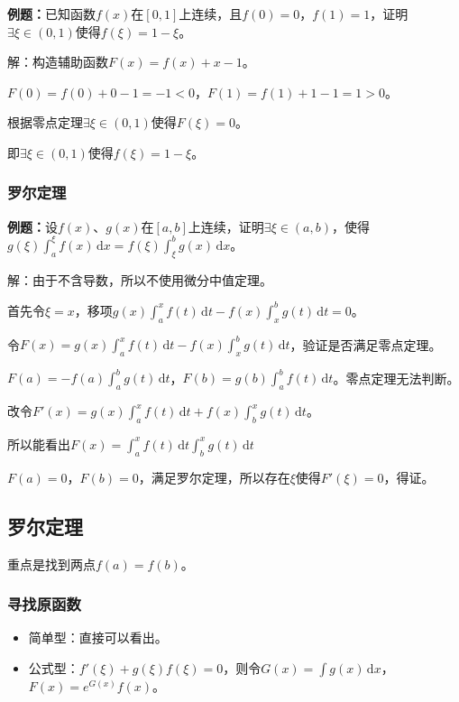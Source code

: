 \textbf{例题：}已知函数$f(x)$在$[0,1]$上连续，且$f(0)=0$，$f(1)=1$，证明$\exists\xi\in(0,1)$使得$f(\xi)=1-\xi$。

解：构造辅助函数$F(x)=f(x)+x-1$。

$F(0)=f(0)+0-1=-1<0$，$F(1)=f(1)+1-1=1>0$。

根据零点定理$\exists\xi\in(0,1)$使得$F(\xi)=0$。

即$\exists\xi\in(0,1)$使得$f(\xi)=1-\xi$。

\subsubsection{罗尔定理}

\textbf{例题：}设$f(x)$、$g(x)$在$[a,b]$上连续，证明$\exists\xi\in(a,b)$，使得$g(\xi)\int_a^\xi f(x)\,\textrm{d}x=f(\xi)\int_\xi^bg(x)\,\textrm{d}x$。

解：由于不含导数，所以不使用微分中值定理。

首先令$\xi=x$，移项$g(x)\int_a^xf(t)\,\textrm{d}t-f(x)\int_x^bg(t)\,\textrm{d}t=0$。

令$F(x)=g(x)\int_a^xf(t)\,\textrm{d}t-f(x)\int_x^bg(t)\,\textrm{d}t$，验证是否满足零点定理。

$F(a)=-f(a)\int_a^bg(t)\,\textrm{d}t$，$F(b)=g(b)\int_a^bf(t)\,\textrm{d}t$。零点定理无法判断。

改令$F'(x)=g(x)\int_a^xf(t)\,\textrm{d}t+f(x)\int_b^xg(t)\,\textrm{d}t$。

所以能看出$F(x)=\int_a^xf(t)\,\textrm{d}t\int_b^xg(t)\,\textrm{d}t$

$F(a)=0$，$F(b)=0$，满足罗尔定理，所以存在$\xi$使得$F'(\xi)=0$，得证。

\subsection{罗尔定理}

重点是找到两点$f(a)=f(b)$。

\subsubsection{寻找原函数}


\begin{itemize}
    \item 简单型：直接可以看出。
    \item 公式型：$f'(\xi)+g(\xi)f(\xi)=0$，则令$G(x)=\int g(x)\,\textrm{d}x$，$F(x)=e^{G(x)}f(x)$。
\end{itemize}

